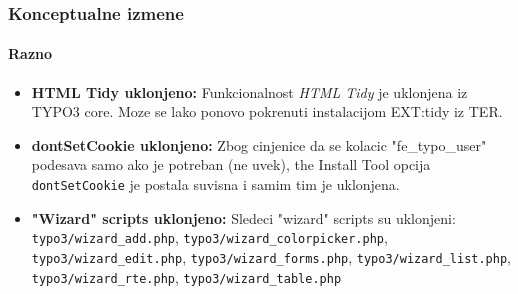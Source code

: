 \begin{frame}[fragile]
	\frametitle{Konceptualne izmene}
	\framesubtitle{Razno}

	\begin{itemize}

		\item \textbf{HTML Tidy uklonjeno:}\newline
			\small
				Funkcionalnost \textit{HTML Tidy} je uklonjena iz TYPO3 core. Moze se lako ponovo pokrenuti instalacijom EXT:tidy iz TER.
			\normalsize

		\item \textbf{dontSetCookie uklonjeno:}\newline
			\small
				Zbog cinjenice da se kolacic "fe\_typo\_user" podesava samo ako je potreban (ne uvek), the Install Tool opcija \texttt{dontSetCookie} je postala suvisna i samim tim je uklonjena.
			\normalsize

		\item \textbf{"Wizard" scripts uklonjeno:}\newline
			\small
				Sledeci "wizard" scripts su uklonjeni:
				\texttt{typo3/wizard\_add.php}, \texttt{typo3/wizard\_colorpicker.php}, \texttt{typo3/wizard\_edit.php}, \texttt{typo3/wizard\_forms.php}, \texttt{typo3/wizard\_list.php}, \texttt{typo3/wizard\_rte.php}, \texttt{typo3/wizard\_table.php}
			\normalsize

	\end{itemize}
	
\end{frame}


